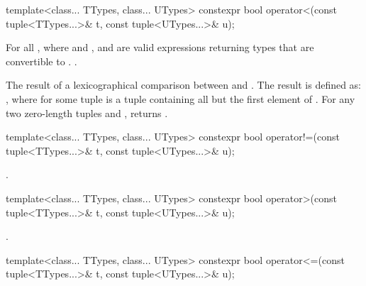 %
\begin{itemdecl}
template<class... TTypes, class... UTypes>
  constexpr bool operator<(const tuple<TTypes...>& t, const tuple<UTypes...>& u);
\end{itemdecl}

\begin{itemdescr}
\pnum
\requires  For all ,
where  and
, 
and 
are valid expressions returning types that are
convertible to .
 \tcode{==}
.

\pnum\returns  The result of a lexicographical comparison
between  and . The result is defined
as: , where  for some
tuple  is a tuple containing all but the first element
of .  For any two zero-length tuples 
and ,  returns .
\end{itemdescr}

%
\begin{itemdecl}
template<class... TTypes, class... UTypes>
  constexpr bool operator!=(const tuple<TTypes...>& t, const tuple<UTypes...>& u);
\end{itemdecl}
\begin{itemdescr}
\pnum\returns {}.
\end{itemdescr}

%
\begin{itemdecl}
template<class... TTypes, class... UTypes>
  constexpr bool operator>(const tuple<TTypes...>& t, const tuple<UTypes...>& u);
\end{itemdecl}
\begin{itemdescr}
\pnum\returns {}.
\end{itemdescr}

%
\begin{itemdecl}
template<class... TTypes, class... UTypes>
  constexpr bool operator<=(const tuple<TTypes...>& t, const tuple<UTypes...>& u);
\end{itemdecl}
\begin{itemdescr}
\pnum\returns {}
\end{itemdescr}

